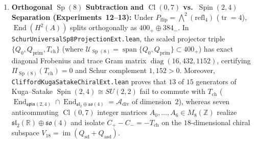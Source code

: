 \documentclass[11pt,a4paper]{article}
\begin{document}
\begin{enumerate}
  \item \textbf{Orthogonal $\operatorname{Sp}(8)$ Subtraction and $\operatorname{Cl}(0,7)$ vs.\ $\operatorname{Spin}(2,4)$ Separation (Experiments~12--13):} Under $P_{\mathrm{flip}} = \bigwedge^2(\mathrm{refl}_4)$ ($\operatorname{tr} = 4$), $\operatorname{End}(H^2(A))$ splits orthogonally as $400_+ \oplus 384_-$. In {\small\texttt{Schur\allowbreak{}Universal\allowbreak{}Sp8\allowbreak{}Projection\allowbreak{}Ext.lean}}, the scaled projector triple $\{Q_0, Q_{\mathrm{prim}}, T_{\mathrm{ch}}\}$ (where $\mathcal{U}_{\operatorname{Sp}(8)} = \operatorname{span}\{Q_0, Q_{\mathrm{prim}}\} \subset 400_+$) has exact diagonal Frobenius and trace Gram matrix $\operatorname{diag}(16, 432, 1152)$, certifying $\Pi_{\operatorname{Sp}(8)}(T_{\mathrm{ch}}) = 0$ and Schur complement $1{,}152 > 0$. Moreover, {\small\texttt{Clifford\allowbreak{}Kuga\allowbreak{}Satake\allowbreak{}Chiral\allowbreak{}Ext.lean}} proves that $13$ of $15$ generators of Kuga--Satake $\operatorname{Spin}(2,4) \cong SU(2,2)$ fail to commute with $T_{\mathrm{ch}}$ ($\operatorname{End}_{\mathfrak{spin}(2,4)} \cap \operatorname{End}_{\mathfrak{sl}_2 \oplus \mathfrak{so}(4)} = \mathcal{A}_{\mathrm{div}}$ of dimension~$2$), whereas seven anticommuting $\operatorname{Cl}(0,7)$ integer matrices $A_0,\dots,A_6 \in M_8(\mathbb{Z})$ realize $\mathfrak{sl}_2(\mathbb{R}) \oplus \mathfrak{so}(4)$ and isolate $C_+ - C_- = -T_{\mathrm{ch}}$ on the $18$-dimensional chiral subspace $V_{18} = \operatorname{im}(Q_{\mathrm{sd}} + Q_{\mathrm{asd}})$.

\end{enumerate}
\end{document}
